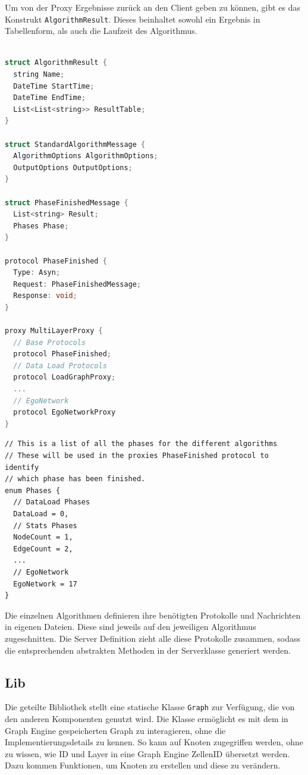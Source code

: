 Um von der Proxy Ergebnisse zurück an den Client geben zu können, gibt es das Konstrukt \verb|AlgorithmResult|. Dieses beinhaltet sowohl ein Ergebnis in Tabellenform, als auch die Laufzeit des Algorithmus.


\begin{lstlisting}[language=c, caption={Definition für die Proxy Protokolle.}]

struct AlgorithmResult {
  string Name;
  DateTime StartTime;
  DateTime EndTime;
  List<List<string>> ResultTable;
}

struct StandardAlgorithmMessage {
  AlgorithmOptions AlgorithmOptions;
  OutputOptions OutputOptions;
}

struct PhaseFinishedMessage {
  List<string> Result;
  Phases Phase;
}

protocol PhaseFinished {
  Type: Asyn;
  Request: PhaseFinishedMessage;
  Response: void;
}

proxy MultiLayerProxy {
  // Base Protocols
  protocol PhaseFinished;
  // Data Load Protocols
  protocol LoadGraphProxy;
  ...
  // EgoNetwork
  protocol EgoNetworkProxy
}
\end{lstlisting}


\begin{lstlisting}
// This is a list of all the phases for the different algorithms
// These will be used in the proxies PhaseFinished protocol to identify
// which phase has been finished.
enum Phases {
  // DataLoad Phases
  DataLoad = 0,
  // Stats Phases
  NodeCount = 1,
  EdgeCount = 2,
  ...
  // EgoNetwork
  EgoNetwork = 17
}
\end{lstlisting}


Die einzelnen Algorithmen definieren ihre benötigten Protokolle und Nachrichten in eigenen Dateien. Diese sind jeweils auf den jeweiligen Algorithmus zugeschnitten.
Die Server Definition zieht alle diese Protokolle zusammen, sodass die entsprechenden abstrakten Methoden in der Serverklasse generiert werden.

\subsection{Lib}


Die geteilte Bibliothek stellt eine statische Klasse \verb|Graph| zur Verfügung, die von den anderen Komponenten genutzt wird. Die Klasse ermöglicht es mit dem in Graph Engine gespeicherten Graph zu interagieren, ohne die Implementierungsdetails zu kennen. So kann auf Knoten zugegriffen werden, ohne zu wissen, wie ID und Layer in eine Graph Engine ZellenID übersetzt werden. 
Dazu kommen Funktionen, um Knoten zu erstellen und diese zu verändern.

